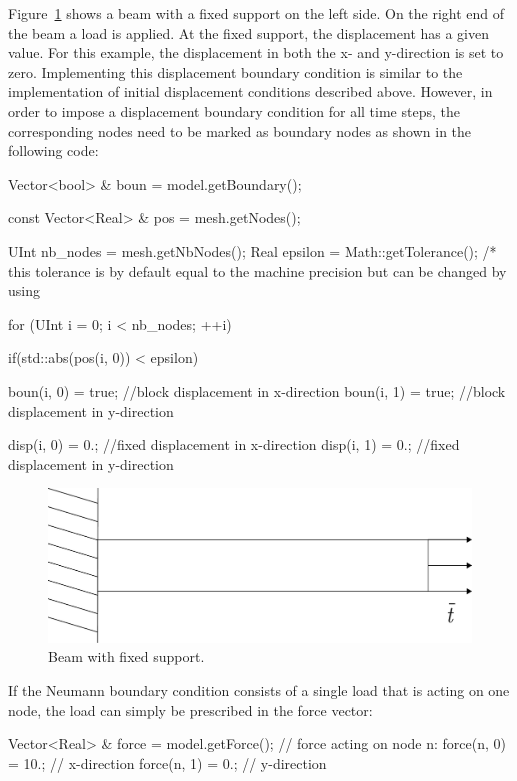 Figure~\ref{fig:smm:dirichlet_bc} shows a beam with  a fixed support on the left
side. On the right end of the beam  a load is applied. At the fixed support, the
displacement has a  given value. For this example, the  displacement in both the
x-  and y-direction  is set  to  zero. Implementing  this displacement  boundary
condition is  similar to the  implementation of initial  displacement conditions
described above. However,  in order to impose a  displacement boundary condition
for all time steps, the corresponding  nodes need to be marked as boundary nodes
as shown in the following code:
\begin{cpp}
  Vector<bool> & boun = model.getBoundary();

  const Vector<Real> & pos = mesh.getNodes();

  UInt nb_nodes = mesh.getNbNodes();
  Real epsilon = Math::getTolerance();
  /* this  tolerance is  by default equal  to the  machine precision but  can be changed by using %

  for (UInt i = 0; i < nb_nodes; ++i) {
    if(std::abs(pos(i, 0)) < epsilon) {
      boun(i, 0) = true;  //block displacement in x-direction
      boun(i, 1) = true;  //block displacement in y-direction

      disp(i, 0) = 0.;   //fixed displacement in x-direction
      disp(i, 1) = 0.;   //fixed displacement in y-direction
    }
  }
\end{cpp}
\begin{figure}[!htb]
  \centering
  \includegraphics[scale=0.4]{figures/dirichlet}
  \caption{Beam with fixed support.\label{fig:smm:dirichlet_bc}}
\end{figure}

If the Neumann boundary condition consists of a single load that is acting on one
node, the load can simply be prescribed in the force vector:
\begin{cpp}
  Vector<Real> & force = model.getForce();
  // force acting on node n:
  force(n, 0) = 10.; // x-direction
  force(n, 1) = 0.; // y-direction
\end{cpp}

